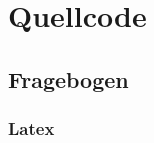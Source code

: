 
\appendix
\chapter{Quellcode}

\section{Fragebogen}
\subsection{Latex}\label{ap:FragTex}
\lstset{language=TeX}




%

%


%
%

%
%

